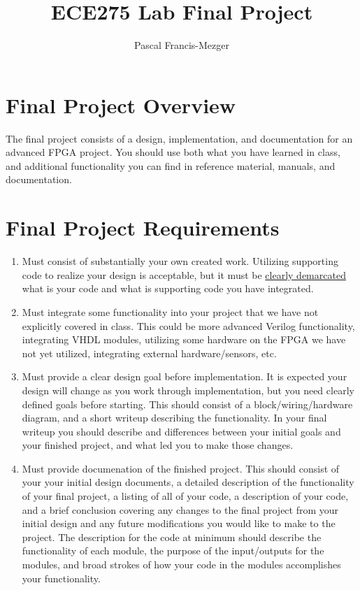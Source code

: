 \documentclass{article}
\begin{document}
\setcounter{section}{-1}
\title{ECE275 Lab Final Project}
\author{Pascal Francis-Mezger\\
}
 
\maketitle


\color{myLayoutColorAux}

\color{myLayoutColorMain}
\section*{Final Project Overview}
\color{black}
The final project consists of a design, implementation, and documentation for an advanced FPGA project. You should use both what you have learned in class, and additional functionality you can find in reference material, manuals, and documentation.

\color{myLayoutColorMain}
\section*{Final Project Requirements}
\color{black}
\begin{enumerate}
    \item Must consist of substantially your own created work. Utilizing supporting code to realize your design is acceptable, but it must be \underline{clearly demarcated} what is your code and what is supporting code you have integrated.
    \item Must integrate some functionality into your project that we have not explicitly covered in class. This could be more advanced Verilog functionality, integrating VHDL modules, utilizing some hardware on the FPGA we have not yet utilized, integrating external hardware/sensors, etc.
    \item Must provide a clear design goal before implementation. It is expected your design will change as you work through implementation, but you need clearly defined goals before starting. This should consist of a block/wiring/hardware diagram, and a short writeup describing the functionality. In your final writeup you should describe and differences between your initial goals and your finished project, and what led you to make those changes.
    \item Must provide documenation of the finished project. This should consist of your your initial design documents, a detailed description of the functionality of your final project, a listing of all of your code, a description of your code, and a brief conclusion covering any changes to the final project from your initial design and any future modifications you would like to make to the project. The description for the code at minimum should describe the functionality of each module, the purpose of the input/outputs for the modules, and broad strokes of how your code in the modules accomplishes your functionality. 
\end{enumerate}
\color{myLayoutColorMain}
\end{document}
